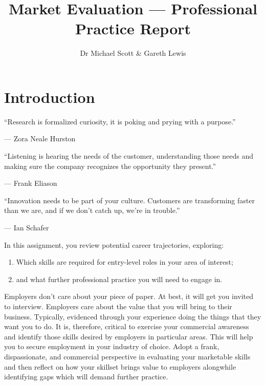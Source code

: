 \documentclass{../../fal_assignment}
\title{Market Evaluation --- Professional Practice Report}
\author{Dr Michael Scott \& Gareth Lewis}
\begin{document}
\maketitle

\section*{Introduction}

\begin{marginquote}
  ``Research is formalized curiosity, it is poking and prying with a purpose.''
  
   --- Zora Neale Hurston
   
    \marginquoterule
    
    ``Listening is hearing the needs of the customer, understanding those needs and making sure the company recognizes the opportunity they present.''
    
    --- Frank Eliason
    
    \marginquoterule
    
    ``Innovation needs to be part of your culture. Customers are transforming faster than we are, and if we don't catch up, we're in trouble.''
    
    --- Ian Schafer
      
\end{marginquote}

In this assignment, you review potential career trajectories, exploring: 

\begin{enumerate}[label=(\roman*)]
    \item Which skills are required for entry-level roles in your area of interest;
    \item and what further professional practice you will need to engage in.
\end{enumerate}

Employers don't care about your piece of paper. At best, it will get you invited to interview. Employers care about the value that you will bring to their business. Typically, evidenced through your experience doing the things that they want you to do. It is, therefore, critical to exercise your commercial awareness and identify those skills desired by employers in particular areas. This will help you to secure employment in your industry of choice. Adopt a frank, dispassionate, and commercial perspective in evaluating your marketable skills and then reflect on how your skillset brings value to employers alongwhile identifying gaps which will demand further practice.
\end{document}
